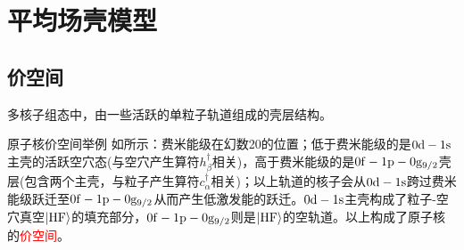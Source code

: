 \chapter{平均场壳模型}

\section{价空间}
\begin{definition}
    多核子组态中，由一些活跃的单粒子轨道组成的壳层结构。
\end{definition}
原子核价空间举例 如所示：费米能级在幻数20的位置；低于费米能级的是$0\rm{d}-1\rm{s}$主壳的活跃空穴态(与空穴产生算符$h_{\beta}^{\dagger}$相关)，高于费米能级的是$0\rm{f}-1\rm{p}-0\rm{g}_{9/2}$壳层(包含两个主壳，与粒子产生算符$c_{\alpha}^{\dagger}$相关)；以上轨道的核子会从$0\rm{d}-1\rm{s}$跨过费米能级跃迁至$0\rm{f}-1\rm{p}-0\rm{g}_{9/2}$从而产生低激发能的跃迁。$0\rm{d}-1\rm{s}$主壳构成了粒子-空穴真空$\ket{\rm{HF}}$的填充部分，$0\rm{f}-1\rm{p}-0\rm{g}_{9/2}$则是$\ket{\rm{HF}}$的空轨道。以上构成了原子核的\textcolor{red}{价空间}。


